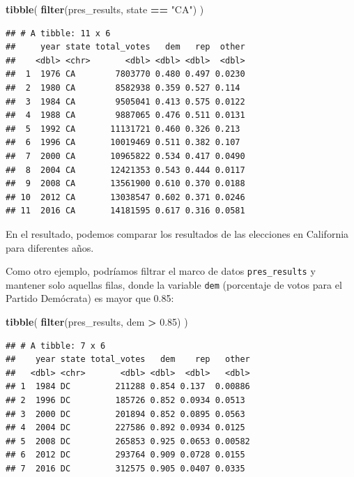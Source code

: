 \documentclass[
]{book}
\newenvironment{Shaded}{\begin{snugshade}}{\end{snugshade}}
\newcommand{\FloatTok}[1]{\textcolor[rgb]{0.00,0.00,0.81}{#1}}
\newcommand{\KeywordTok}[1]{\textcolor[rgb]{0.13,0.29,0.53}{\textbf{#1}}}
\newcommand{\NormalTok}[1]{#1}
\newcommand{\OperatorTok}[1]{\textcolor[rgb]{0.81,0.36,0.00}{\textbf{#1}}}
\newcommand{\StringTok}[1]{\textcolor[rgb]{0.31,0.60,0.02}{#1}}
\begin{document}
\begin{Shaded}
\begin{Highlighting}[]
\KeywordTok{tibble}\NormalTok{(}
\KeywordTok{filter}\NormalTok{(pres_results, state }\OperatorTok{==}\StringTok{ "CA"}\NormalTok{)}
\NormalTok{)}
\end{Highlighting}
\end{Shaded}

\begin{verbatim}
## # A tibble: 11 x 6
##     year state total_votes   dem   rep  other
##    <dbl> <chr>       <dbl> <dbl> <dbl>  <dbl>
##  1  1976 CA        7803770 0.480 0.497 0.0230
##  2  1980 CA        8582938 0.359 0.527 0.114 
##  3  1984 CA        9505041 0.413 0.575 0.0122
##  4  1988 CA        9887065 0.476 0.511 0.0131
##  5  1992 CA       11131721 0.460 0.326 0.213 
##  6  1996 CA       10019469 0.511 0.382 0.107 
##  7  2000 CA       10965822 0.534 0.417 0.0490
##  8  2004 CA       12421353 0.543 0.444 0.0117
##  9  2008 CA       13561900 0.610 0.370 0.0188
## 10  2012 CA       13038547 0.602 0.371 0.0246
## 11  2016 CA       14181595 0.617 0.316 0.0581
\end{verbatim}

En el resultado, podemos comparar los resultados de las elecciones en California para diferentes años.

Como otro ejemplo, podríamos filtrar el marco de datos \texttt{pres\_results} y mantener solo aquellas filas, donde la variable \texttt{dem} (porcentaje de votos para el Partido Demócrata) es mayor que 0.85:

\begin{Shaded}
\begin{Highlighting}[]
\KeywordTok{tibble}\NormalTok{(}
\KeywordTok{filter}\NormalTok{(pres_results, dem }\OperatorTok{>}\StringTok{ }\FloatTok{0.85}\NormalTok{)}
\NormalTok{)}
\end{Highlighting}
\end{Shaded}

\begin{verbatim}
## # A tibble: 7 x 6
##    year state total_votes   dem    rep   other
##   <dbl> <chr>       <dbl> <dbl>  <dbl>   <dbl>
## 1  1984 DC         211288 0.854 0.137  0.00886
## 2  1996 DC         185726 0.852 0.0934 0.0513 
## 3  2000 DC         201894 0.852 0.0895 0.0563 
## 4  2004 DC         227586 0.892 0.0934 0.0125 
## 5  2008 DC         265853 0.925 0.0653 0.00582
## 6  2012 DC         293764 0.909 0.0728 0.0155 
## 7  2016 DC         312575 0.905 0.0407 0.0335
\end{verbatim}
\end{document}
